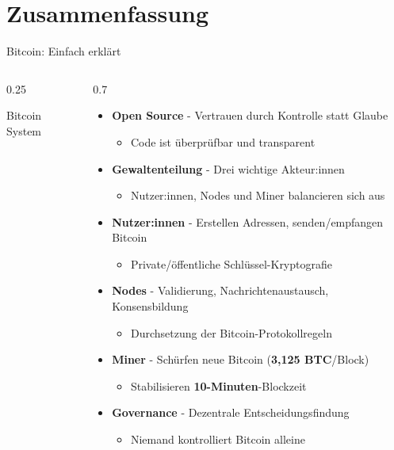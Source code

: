 \documentclass[aspectratio=169,t,11pt]{beamer}
\begin{document}
\section{Zusammenfassung}

\begin{frame}{Bitcoin: Einfach erklärt}
	\begin{columns}[T]
		\begin{column}{0.25\textwidth}
			\centering
			\vspace{0.3cm}

			{\small Bitcoin System}
		\end{column}

		\begin{column}{0.7\textwidth}
			\begin{itemize}
				\item \textbf{Open Source} - Vertrauen durch Kontrolle statt Glaube
				      \begin{itemize}
					      \item Code ist überprüfbar und transparent
				      \end{itemize}
				\item \textbf{Gewaltenteilung} - Drei wichtige Akteur:innen
				      \begin{itemize}
					      \item Nutzer:innen, Nodes und Miner balancieren sich aus
				      \end{itemize}
				\item \textbf{Nutzer:innen} - Erstellen Adressen, senden/empfangen Bitcoin
				      \begin{itemize}
					      \item Private/öffentliche Schlüssel-Kryptografie
				      \end{itemize}
				\item \textbf{Nodes} - Validierung, Nachrichtenaustausch, Konsensbildung
				      \begin{itemize}
					      \item Durchsetzung der Bitcoin-Protokollregeln
				      \end{itemize}
				\item \textbf{Miner} - Schürfen neue Bitcoin (\textbf{3,125 BTC}/Block)
				      \begin{itemize}
					      \item Stabilisieren \textbf{10-Minuten}-Blockzeit
				      \end{itemize}
				\item \textbf{Governance} - Dezentrale Entscheidungsfindung
				      \begin{itemize}
					      \item Niemand kontrolliert Bitcoin alleine
				      \end{itemize}
			\end{itemize}
		\end{column}
	\end{columns}
\end{frame}
\end{document}
